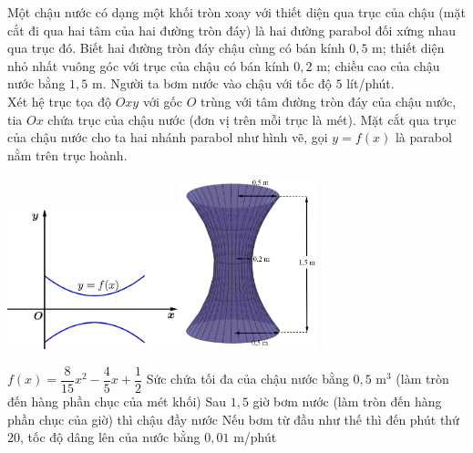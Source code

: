 \begin{ex}%
Một chậu nước có dạng một khối tròn xoay với thiết diện qua trục của chậu (mặt cắt đi qua hai tâm của hai đường tròn đáy) là hai đường parabol đối xứng nhau qua trục đó. Biết hai đường tròn đáy chậu cùng có bán kính $0{,}5$ m; thiết diện nhỏ nhất vuông góc với trục của chậu có bán kính $0{,}2$ m; chiều cao của chậu nước bằng $1{,}5$ m. Người ta bơm nước vào chậu với tốc độ $5$ lít/phút.\\
Xét hệ trục tọa độ $Oxy$ với gốc $O$ trùng với tâm đường tròn đáy của chậu nước, tia $Ox$ chứa trục của chậu nước (đơn vị trên mỗi trục là mét). Mặt cắt qua trục của chậu nước cho ta hai nhánh parabol như hình vẽ, gọi $ y=f(x)$ là parabol nằm trên trục hoành.
\begin{center}
    \includegraphics[width=5cm]{img/HXN-13-15-a}\includegraphics[height=5cm]{img/HXN-13-15-b}
\end{center}
\choiceTF
 {\True $ f(x)=\dfrac{8}{15}{x^2}-\dfrac{4}{5}x+\dfrac{1}{2}$}
 {\True Sức chứa tối đa của chậu nước bằng $0{,}5$ m$^3$ (làm tròn đến hàng phần chục của mét khối)}
 {\True Sau $1{,}5$ giờ bơm nước (làm tròn đến hàng phần chục của giờ) thì chậu đầy nước}
 {\True Nếu bơm từ đầu như thế thì đến phút thứ $20$, tốc độ dâng lên của nước bằng $0{,}01$ m/phút}
\end{ex}
